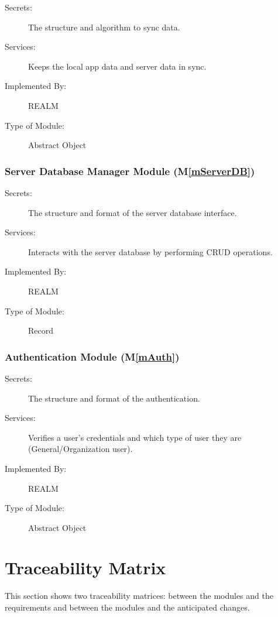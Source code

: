 \documentclass[12pt, titlepage]{article}
\newcommand{\mref}[1]{M\ref{#1}}
\begin{document}
\begin{description}
\item[Secrets:]The structure and algorithm to sync data.
\item[Services:]Keeps the local app data and server data in sync. 
\item[Implemented By:]REALM
\item[Type of Module:]Abstract Object
\end{description}

\subsubsection{Server Database Manager Module (\mref{mServerDB})}

\begin{description}
\item[Secrets:]The structure and format of the server database interface.
\item[Services:]Interacts with the server database by performing CRUD operations.
\item[Implemented By:]REALM
\item[Type of Module:]Record
\end{description}

\subsubsection{Authentication Module (\mref{mAuth})}

\begin{description}
\item[Secrets:]The structure and format of the authentication.
\item[Services:]Verifies a user's credentials and which type of user they are (General/Organization user).
\item[Implemented By:]REALM
\item[Type of Module:]Abstract Object
\end{description}

\newpage

\section{Traceability Matrix} \label{SecTM}

This section shows two traceability matrices: between the modules and the
requirements and between the modules and the anticipated changes.
\end{document}
